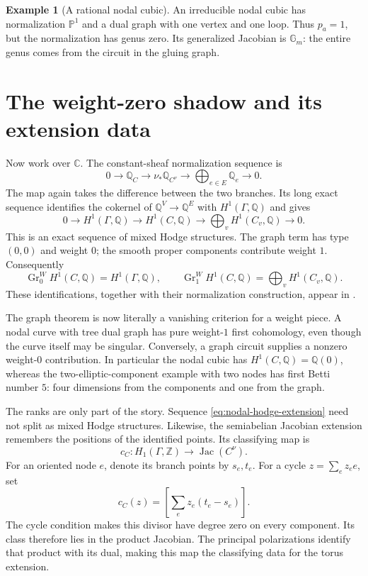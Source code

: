 \documentclass[11pt]{article}
\theoremstyle{definition}
\newtheorem{example}[theorem]{Example}
\theoremstyle{remark}
\newcommand{\Q}{\mathbb Q}
\newcommand{\Z}{\mathbb Z}
\newcommand{\C}{\mathbb C}
\begin{document}
\begin{example}[A rational nodal cubic]
An irreducible nodal cubic has normalization $\mathbb P^1$ and a dual graph
with one vertex and one loop.  Thus $p_a=1$, but the normalization has genus
zero.  Its generalized Jacobian is $\mathbb G_m$: the entire genus comes
from the circuit in the gluing graph.
\end{example}

\section{The weight-zero shadow and its extension data}
\label{sec:graph-hodge-weights}

Now work over $\C$.  The constant-sheaf normalization sequence is
\[
  0\longrightarrow\Q_C\longrightarrow\nu_*\Q_{C^\nu}
   \longrightarrow\bigoplus_{e\in E}\Q_e\longrightarrow0.
\]
The map again takes the difference between the two branches.  Its long
exact sequence identifies the cokernel of $\Q^V\to\Q^E$ with
$H^1(\Gamma,\Q)$ and gives
\begin{equation}
\label{eq:nodal-hodge-extension}
  0\longrightarrow H^1(\Gamma,\Q)\longrightarrow H^1(C,\Q)
   \longrightarrow\bigoplus_v H^1(C_v,\Q)\longrightarrow0.
\end{equation}
This is an exact sequence of mixed Hodge structures.  The graph term has
type $(0,0)$ and weight $0$; the smooth proper components contribute weight
$1$.  Consequently
\[
  \operatorname{Gr}^W_0H^1(C,\Q)=H^1(\Gamma,\Q),\qquad
  \operatorname{Gr}^W_1H^1(C,\Q)=\bigoplus_vH^1(C_v,\Q).
\]
These identifications, together with their normalization construction,
appear in \cite[\S6.1, equations (25)--(27)]{DCHMSupportHitchin}.

The graph theorem is now literally a vanishing criterion for a weight
piece.  A nodal curve with tree dual graph has pure weight-$1$ first
cohomology, even though the curve itself may be singular.  Conversely, a
graph circuit supplies a nonzero weight-$0$ contribution.  In particular
the nodal cubic has $H^1(C,\Q)=\Q(0)$, whereas the two-elliptic-component
example with two nodes has first Betti number $5$: four dimensions from
the components and one from the graph.

The ranks are only part of the story.  Sequence
\eqref{eq:nodal-hodge-extension} need not split as mixed Hodge structures.
Likewise, the semiabelian Jacobian extension remembers the positions of
the identified points.  Its classifying map is
\[
  c_C:H_1(\Gamma,\Z)\longrightarrow\operatorname{Jac}(C^\nu).
\]
For an oriented node $e$, denote its branch points by $s_e,t_e$.
For a cycle $z=\sum_e z_e e$, set
\[
  c_C(z)=\left[\sum_e z_e(t_e-s_e)\right].
\]
The cycle condition makes this divisor have degree zero on every
component.  Its class therefore lies in the product Jacobian.  The
principal polarizations identify that product with its dual, making this
map the classifying data for the torus extension.
\end{document}
